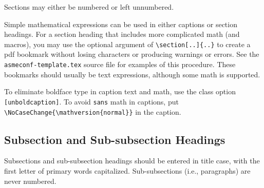 \documentclass[captionpatch,colorlinks,upint,subscriptcorrection,varvw,german]{asmeconf}
\begin{document}
Sections may either be numbered or left unnumbered.

Simple mathematical expressions can be used in either captions or section headings. For a section heading that includes more complicated math (and macros), you may use the optional argument of \verb|\section[..]{..}| to create a pdf bookmark without losing characters or producing warnings or errors. See the \texttt{asmeconf-template.tex} source file for examples of this procedure. These bookmarks should usually be text expressions, although some math is supported.

To eliminate boldface type in caption text and math, use the class option \texttt{[unboldcaption]}.  To avoid \texttt{sans} math in captions, put \verb|\NoCaseChange{\mathversion{normal}}| in the caption.

\subsection{Subsection and Sub-subsection Headings}

Subsections and sub-subsection headings should be entered in title case, with the first letter of primary words capitalized. Sub-subsections (i.e., paragraphs) are never numbered.




\begin{table}[t]
\caption[Table]{A simple table}\label{tab:1}
\end{table}


\end{document}
